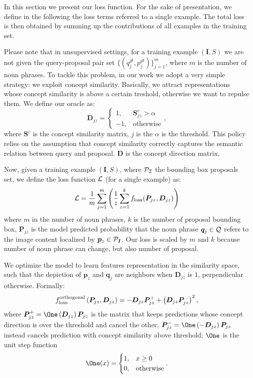 \documentclass{article}
\begin{document}
In this section we present our loss function. For the sake of
presentation, we define in the following the loss terms referred to a
single example. The total loss is then obtained by summing up the
contributions of all examples in the training set.

Please note that in unsupervised settings, for a training example
$\left( \bm{I}, S \right)$ we are not given the query-proposal pair
set $\{ ( q^{gt}_j, p^{gt}_j ) \}^m_{j=1}$, where $m$ is the number of
noun phrases. To tackle this problem, in our work we adopt a very
simple strategy: we exploit concept similarity. Basically, we attract
representations whose concept similarity is above a certain treshold,
otherwise we want to repulse them. We define our oracle as:
\begin{equation}
  \bm{D}_{jz} =
  \begin{cases}
    1, & \bm{S}^c_{jz} > \alpha \\
    -1, & \text{otherwise}
  \end{cases},
\end{equation}
where $\bm{S}^c$ is the concept similarity matrix, $j$ is the
$\alpha$ is the threshold. This policy relies on the assumption that
concept similarity correctly captures the semantic relation between
query and proposal. $\bm{D}$ is the concept direction matrix.

Now, given a training example $\left( \bm{I}, S \right)$, where
$\cal{P}_{\bm{I}}$ the bounding box proposals set, we define the loss
function $\mathcal{L}$ (for a single example) as:
\begin{equation}
  \mathcal{L} = \frac{1}{m} \sum^m_{j=1} \Bigg( \frac{1}{z} \sum^k_{z=1} f_{\text{loss}} ( \bm{P}_{jz}, \bm{D}_{jz} ) \Bigg)
\end{equation}
where $m$ in the number of noun phrases, $k$ is the number of proposal
bounding box, $\bm{P}_{jz}$ is the model predicted probability that
the noun phrase $\bm{q}_j \in \mathcal{Q}$ refers to the image content
localized by $\bm{p}_z \in \mathcal{P}_{\bm{I}}$. Our loss is scaled by $m$
and $k$ because number of noun phrase can change, but also number of
proposal. 

We optimize the model to learn features representation in the
similarity space, such that the depiction of $\bm{p}_z$ and $\bm{q}_j$
are neighbors when $\bm{D}_{jz}$ is $1$, perpendicular otherwise.
Formally:
\begin{equation}
  f_{\text{loss}}^{\text{orthogonal}} \left( \bm{P}_{jz}, \bm{D}_{jz} \right) = - \bm{D}_{jz} \bm{P}^+_{jz} + \left( \bm{D}_{jz} \bm{P}^-_{jz} \right)^2,
\end{equation}
where $\bm{P}^+_{jz} = \One\left( \bm{D}_{jz} \right) \bm{P}_{jz}$
is the matrix that keeps predictions whose concept direction is over
the threshold and cancel the other, $\bm{P}^-_{jz} = \One\left( -
\bm{D}_{jz} \right) \bm{P}_{jz}$ instead cancels prediction with
concept similarity above threshold; $\One$ is the unit step function
\begin{equation}
  \One(x) =
  \begin{cases}
    1, & x \geq 0 \\
    0, & \text{otherwise}
  \end{cases}.
\end{equation}
\end{document}
